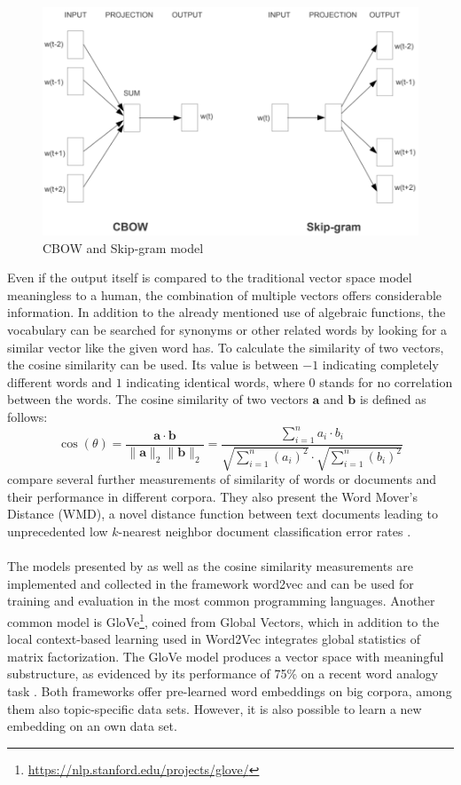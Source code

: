 \documentclass[article,type=msc,colorback,accentcolor=tud7b]{tudthesis}
\begin{document}
    \begin{figure}[H]
      \centering
      \includegraphics[scale=0.75]{images/word_embeddings}
      \caption[CBOW and Skip-gram model]{CBOW and Skip-gram model \autocite{Mikolov2013}}
      \label{fig:word_embeddings}
    \end{figure}
    
    Even if the output itself is compared to the traditional vector space model meaningless to a human, the combination of multiple vectors offers considerable information. In addition to the already mentioned use of algebraic functions, the vocabulary can be searched for synonyms or other related words by looking for a similar vector like the given word has. To calculate the similarity of two vectors, the cosine similarity can be used. Its value is between $-1$ indicating completely different words and $1$ indicating identical words, where $0$ stands for no correlation between the words. The cosine similarity of two vectors $\mathbf{a}$ and $\mathbf{b}$ is defined as follows:
    \[\cos (\theta)=\frac{\mathbf{a} \cdot \mathbf{b}}{\|\mathbf{a}\|_{2}\|\mathbf{b}\|_{2}}=\frac{\sum_{i=1}^{n} a_{i} \cdot b_{i}}{\sqrt{\sum_{i=1}^{n}\left(a_{i}\right)^{2}} \cdot \sqrt{\sum_{i=1}^{n}\left(b_{i}\right)^{2}}}\]
    \citeauthor{Kusner2015} compare several further measurements of similarity of words or documents and their performance in different corpora. They also present the Word Mover’s Distance (WMD), a novel distance function between text documents leading to unprecedented low $k$-nearest neighbor document classification error rates \autocite{Kusner2015}. \\\\
    The models presented by \citeauthor{Mikolov2013} as well as the cosine similarity measurements are implemented and collected in the framework word2vec and can be used for training and evaluation in the most common programming languages. Another common model is GloVe\footnote{\url{https://nlp.stanford.edu/projects/glove/}}, coined from Global Vectors, which in addition to the local context-based learning used in Word2Vec integrates global statistics of matrix factorization. The GloVe model produces a vector space with meaningful substructure, as evidenced by its performance of 75\% on a recent word analogy task \autocite{Pennington2014}. Both frameworks offer pre-learned word embeddings on big corpora, among them also topic-specific data sets. However, it is also possible to learn a new embedding on an own data set.
  
\end{document}
